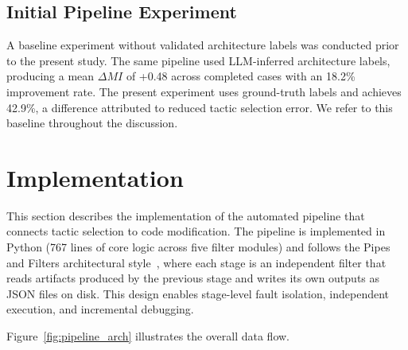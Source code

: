 \documentclass[sigconf,review,anonymous]{acmart}
\begin{document}
\subsection{Initial Pipeline Experiment}
\label{sec:eval_pipeline}

A baseline experiment without validated architecture labels was conducted prior to the present study. The same pipeline used LLM-inferred architecture labels, producing a mean $\Delta MI$ of +0.48 across completed cases with an 18.2\% improvement rate. The present experiment uses ground-truth labels and achieves 42.9\%, a difference attributed to reduced tactic selection error. We refer to this baseline throughout the discussion.

\FloatBarrier
\section{Implementation}
\label{sec:implementation}

This section describes the implementation of the automated pipeline that connects tactic selection to code modification. The pipeline is implemented in Python (767 lines of core logic across five filter modules) and follows the Pipes and Filters architectural style~\cite{bass2021software}, where each stage is an independent filter that reads artifacts produced by the previous stage and writes its own outputs as JSON files on disk. This design enables stage-level fault isolation, independent execution, and incremental debugging.

Figure~\ref{fig:pipeline_arch} illustrates the overall data flow.
\end{document}
